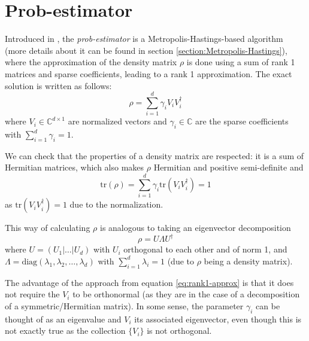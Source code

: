 \documentclass[12pt]{memoir}
\newcommand{\tr}{\text{tr}}
\begin{document}
\section{Prob-estimator}\label{section:prob-estimator}
Introduced in \cite{MA17}, the \textit{prob-estimator} is a Metropolis-Hastings-based algorithm (more details about it can be found in section \ref{section:Metropolis-Hastings}), where the approximation of the density matrix $\rho$ is done using a sum of rank 1 matrices and sparse coefficients, leading to a rank 1 approximation. The exact solution is written as follows:
\begin{equation}\label{eq:rank1-approx}
    \rho = \sum_{i=1}^d \gamma_i V_i V_i^\dagger
\end{equation}
where $V_i \in \mathbb{C}^{d\times 1}$ are normalized vectors and $\gamma_i \in \mathbb{C}$ are the sparse coefficients with $\sum_{i=1}^d \gamma_i = 1$.\medbreak

We can check that the properties of a density matrix are respected: it is a sum of Hermitian matrices, which also makes $\rho$ Hermitian and positive semi-definite and 
\begin{equation}
    \tr(\rho) = \sum_{i=1}^{d} \gamma_i \tr(V_i V_i^\dagger) = 1
\end{equation}
as $\tr(V_i V_i^\dagger) = 1$ due to the normalization.\medbreak

This way of calculating $\rho$ is analogous to taking an eigenvector decomposition
\begin{equation}
    \rho = U\Lambda U^\dagger
\end{equation}
where $U = (U_1|\dots|U_d)$ with $U_i$ orthogonal to each other and of norm 1, and $\Lambda = \text{diag}(\lambda_1, \lambda_2, \dots, \lambda_d)$ with $\sum_{i=1}^d \lambda_i = 1$ (due to $\rho$ being a density matrix).\medbreak

The advantage of the approach from equation \ref{eq:rank1-approx} is that it does not require the $V_i$ to be orthonormal (as they are in the case of a decomposition of a symmetric/Hermitian matrix). In some sense, the parameter $\gamma_i$ can be thought of as an eigenvalue and $V_i$ its associated eigenvector, even though this is not exactly true as the collection $\{V_i\}$ is not orthogonal. \medbreak
\end{document}

